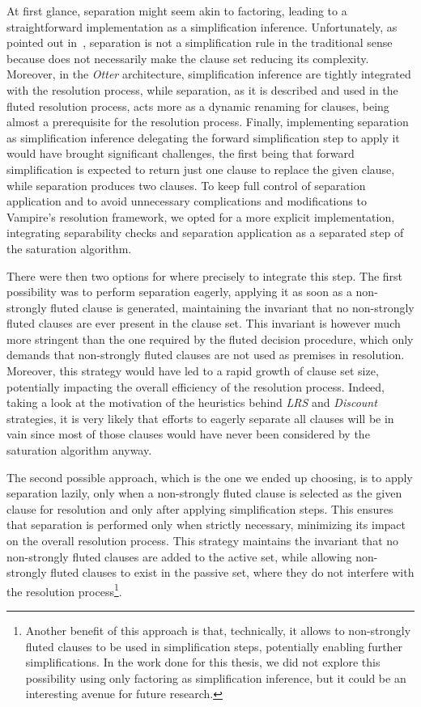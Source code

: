 At first glance, separation might seem akin to factoring, leading to a straightforward implementation as a simplification inference.
Unfortunately, as pointed out in~\cite{hustadt2000resolution}, separation is not a simplification rule in the traditional sense because does not necessarily make the clause set  reducing its complexity.
Moreover, in the \emph{Otter} architecture, simplification inference are tightly integrated with the resolution process, while separation, as it is described and used in the fluted resolution process, acts more as a dynamic renaming for clauses, being almost a prerequisite for the resolution process.
Finally, implementing separation as simplification inference delegating the forward simplification step to apply it would have brought significant challenges, the first being that forward simplification is expected to return just one clause to replace the given clause, while separation produces two clauses.
To keep full control of separation application and to avoid unnecessary complications and modifications to Vampire's resolution framework, we opted for a more explicit implementation, integrating separability checks and separation application as a separated step of the saturation algorithm.

There were then two options for where precisely to integrate this step.
The first possibility was to perform separation eagerly, applying it as soon as a non-strongly fluted clause is generated, maintaining the invariant that no non-strongly fluted clauses are ever present in the clause set.
This invariant is however much more stringent than the one required by the fluted decision procedure, which only demands that non-strongly fluted clauses are not used as premises in resolution.
Moreover, this strategy would have led to a rapid growth of clause set size, potentially impacting the overall efficiency of the resolution process.
Indeed, taking a look at the motivation of the heuristics behind \emph{LRS} and \emph{Discount} strategies, it is very likely that efforts to eagerly separate all clauses will be in vain since most of those clauses would have never been considered by the saturation algorithm anyway.

The second possible approach, which is the one we ended up choosing, is to apply separation lazily, only when a non-strongly fluted clause is selected as the given clause for resolution and only after applying simplification steps.
This ensures that separation is performed only when strictly necessary, minimizing its impact on the overall resolution process.
This strategy maintains the invariant that no non-strongly fluted clauses are added to the active set, while allowing non-strongly fluted clauses to exist in the passive set, where they do not interfere with the resolution process\footnote{
  Another benefit of this approach is that, technically, it allows to non-strongly fluted clauses to be used in simplification steps, potentially enabling further simplifications.
  In the work done for this thesis, we did not explore this possibility using only factoring as simplification inference, but it could be an interesting avenue for future research.
}.

